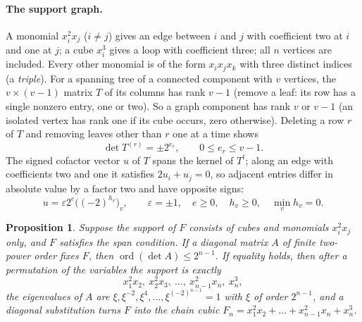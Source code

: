 \documentclass[11pt,a4paper]{article}
\newtheorem{proposition}[theorem]{Proposition}
\theoremstyle{definition}
\newcommand{\ord}{\operatorname{ord}}
\begin{document}
\paragraph{The support graph.}
A monomial $x_i^2x_j$ ($i\ne j$) gives an edge between $i$ and $j$ with
coefficient two at $i$ and one at $j$; a cube $x_i^3$ gives a loop with
coefficient three; all $n$ vertices are included. Every other monomial is of
the form $x_ix_jx_k$ with three distinct indices (a \emph{triple}). For a
spanning tree of a connected component with $v$ vertices, the $v\times(v-1)$
matrix $T$ of its columns has rank $v-1$ (remove a leaf: its row has a single
nonzero entry, one or two). So a graph component has rank $v$ or $v-1$ (an
isolated vertex has rank one if its cube occurs, zero otherwise). Deleting a
row $r$ of $T$ and removing leaves other than $r$ one at a time shows
\begin{equation}\label{eq:treeminor}
 \det T^{(r)}=\pm2^{e_r},\qquad 0\le e_r\le v-1 .
\end{equation}
The signed cofactor vector $u$ of $T$ spans the kernel of $T^t$; along an edge
with coefficients two and one it satisfies $2u_i+u_j=0$, so adjacent entries
differ in absolute value by a factor two and have opposite signs:
\begin{equation}\label{eq:cofactor}
 u=\varepsilon2^{e}\bigl((-2)^{h_v}\bigr)_v,\qquad
 \varepsilon=\pm1,\quad e\ge0,\quad h_v\ge0,\quad\min_vh_v=0 .
\end{equation}

\begin{proposition}\label{prop:graphsupport}
Suppose the support of $F$ consists of cubes and monomials $x_i^2x_j$ only, and
$F$ satisfies the span condition. If a diagonal matrix $A$ of finite two-power
order fixes $F$, then $\ord(\det A)\le2^{n-1}$. If equality holds, then after
a permutation of the variables the support is exactly
\begin{equation}\label{eq:chainsupport}
 x_1^2x_2,\ x_2^2x_3,\ \dots,\ x_{n-1}^2x_n,\ x_n^3,
\end{equation}
the eigenvalues of $A$ are $\xi,\xi^{-2},\xi^4,\dots,\xi^{(-2)^{n-1}}=1$ with
$\xi$ of order $2^{n-1}$, and a diagonal substitution turns $F$ into the chain
cubic $F_n=x_1^2x_2+\dots+x_{n-1}^2x_n+x_n^3$.
\end{proposition}
\end{document}

